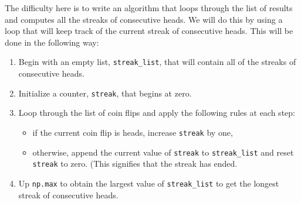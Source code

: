 \documentclass{ximera}
\begin{document}
The difficulty here is to write an algorithm that loops through the list of results and computes all the streaks of consecutive heads. We will do this by using a loop that will keep track of the current streak of consecutive heads. This will be done in the following way:
\begin{enumerate}
	\item Begin with an empty list, \verb|streak_list|, that will contain all of the streaks of consecutive heads.
	\item Initialize a counter, \verb|streak|, that begins at zero.
	\item Loop through the list of coin flips and apply the following rules at each step:
		\begin{itemize}
			\item if the current coin flip is heads, increase \verb|streak| by one,
			\item otherwise, append the current value of \verb|streak| to \verb|streak_list| and reset \verb|streak| to zero. (This signifies that the streak has ended.
		\end{itemize}
	\item Up \verb|np.max| to obtain the largest value of \verb|streak_list| to get the longest streak of consecutive heads.
\end{enumerate}
\end{document}
